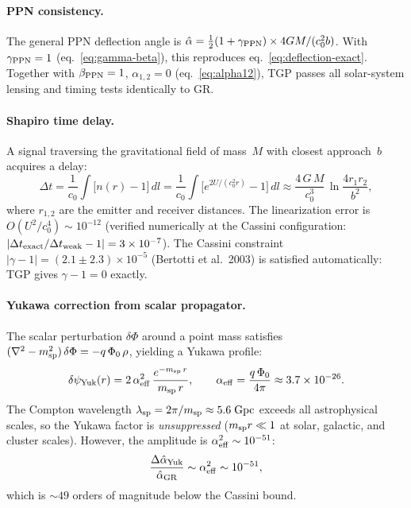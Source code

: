 \paragraph{PPN consistency.}
The general PPN deflection angle is
$\hat\alpha = \tfrac{1}{2}(1+\gamma_{\rm PPN})\times 4GM/(c_0^2 b)$.
With $\gamma_{\rm PPN} = 1$ (eq.~\eqref{eq:gamma-beta}),
this reproduces eq.~\eqref{eq:deflection-exact}. Together with
$\beta_{\rm PPN} = 1$, $\alpha_{1,2} = 0$
(eq.~\eqref{eq:alpha12}), TGP passes all solar-system lensing
and timing tests identically to GR.

\paragraph{Shapiro time delay.}
A signal traversing the gravitational field of mass~$M$
with closest approach~$b$ acquires a delay:
\begin{equation}\label{eq:shapiro-TGP}
  \Delta t = \frac{1}{c_0}\int\!\bigl[n(r) - 1\bigr]\,dl
           = \frac{1}{c_0}\int\!\bigl[e^{2U/(c_0^2 r)} - 1\bigr]\,dl
           \approx \frac{4\,G\,M}{c_0^3}\,\ln\!\frac{4r_1 r_2}{b^2},
\end{equation}
where $r_{1,2}$ are the emitter and receiver distances.
The linearization error is $O(U^2/c_0^4) \sim 10^{-12}$
(verified numerically at the Cassini configuration:
$|\Delta t_{\rm exact}/\Delta t_{\rm weak} - 1| = 3 \times 10^{-7}$).
The Cassini constraint $|\gamma - 1| = (2.1 \pm 2.3)\times 10^{-5}$
(Bertotti et al.\ 2003) is satisfied automatically:
TGP gives $\gamma - 1 = 0$ exactly.

\paragraph{Yukawa correction from scalar propagator.}
The scalar perturbation $\delta\Phi$ around a point mass
satisfies $(\nabla^2 - m_{\rm sp}^2)\,\delta\Phi = -q\,\Phi_0\,\rho$,
yielding a Yukawa profile:
\begin{equation}\label{eq:yukawa-lens}
  \delta\psi_{\rm Yuk}(r)
  = 2\,\alpha_{\rm eff}^2\,\frac{e^{-m_{\rm sp}\,r}}{m_{\rm sp}\,r},
  \qquad
  \alpha_{\rm eff} = \frac{q\,\Phi_0}{4\pi}
  \approx 3.7 \times 10^{-26}.
\end{equation}
The Compton wavelength $\lambda_{\rm sp} = 2\pi/m_{\rm sp}
\approx 5.6\;\mathrm{Gpc}$ exceeds all astrophysical
scales, so the Yukawa factor is \emph{unsuppressed}
($m_{\rm sp} r \ll 1$ at solar, galactic, and cluster scales).
However, the amplitude is $\alpha_{\rm eff}^2 \sim 10^{-51}$:
\begin{equation}\label{eq:delta-alpha-yukawa}
  \frac{\Delta\hat\alpha_{\rm Yuk}}{\hat\alpha_{\rm GR}}
  \sim \alpha_{\rm eff}^2 \sim 10^{-51},
\end{equation}
which is $\sim\!49$ orders of magnitude below the Cassini bound.

